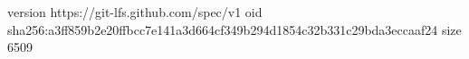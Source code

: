 version https://git-lfs.github.com/spec/v1
oid sha256:a3ff859b2e20ffbcc7e141a3d664cf349b294d1854c32b331c29bda3eccaaf24
size 6509
